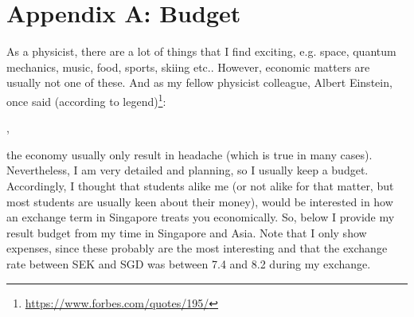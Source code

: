 \appendix
{}
\chapter*{Appendix A: Budget}
As a physicist, there are a lot of things that I find exciting, e.g. space, quantum mechanics, music, food, sports, skiing etc.. However, economic matters are usually not one of these. And as my fellow physicist colleague, Albert Einstein, once said (according to legend)\footnote{\href{https://www.forbes.com/quotes/195/}{https://www.forbes.com/quotes/195/}}:

,

the economy usually only result in headache (which is true in many cases). Nevertheless, I am very detailed and planning, so I usually keep a budget. Accordingly, I thought that students alike me (or not alike for that matter, but most students are usually keen about their money), would be interested in how an exchange term in Singapore treats you economically. So, below I provide my result budget from my time in Singapore and Asia. Note that I only show expenses, since these probably are the most interesting and that the exchange rate between SEK and SGD was between 7.4 and 8.2 during my exchange.

